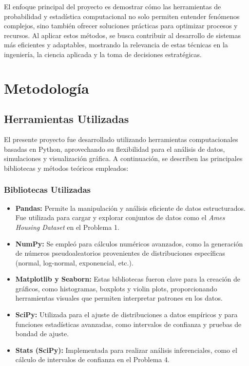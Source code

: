 \documentclass[12pt]{article}
\begin{document}
El enfoque principal del proyecto es demostrar cómo las herramientas de probabilidad y estadística computacional no solo permiten entender fenómenos complejos, sino también ofrecer soluciones prácticas para optimizar procesos y recursos. Al aplicar estos métodos, se busca contribuir al desarrollo de sistemas más eficientes y adaptables, mostrando la relevancia de estas técnicas en la ingeniería, la ciencia aplicada y la toma de decisiones estratégicas.



\section{Metodología}
\subsection{Herramientas Utilizadas}

El presente proyecto fue desarrollado utilizando herramientas computacionales basadas en Python, aprovechando su flexibilidad para el análisis de datos, simulaciones y visualización gráfica. A continuación, se describen las principales bibliotecas y métodos teóricos empleados:

\subsubsection*{Bibliotecas Utilizadas}
\begin{itemize}
    \item \textbf{Pandas:} Permite la manipulación y análisis eficiente de datos estructurados. Fue utilizada para cargar y explorar conjuntos de datos como el \textit{Ames Housing Dataset} en el Problema 1.
    \item \textbf{NumPy:} Se empleó para cálculos numéricos avanzados, como la generación de números pseudoaleatorios provenientes de distribuciones específicas (normal, log-normal, exponencial, etc.).
    \item \textbf{Matplotlib y Seaborn:} Estas bibliotecas fueron clave para la creación de gráficos, como histogramas, boxplots y violin plots, proporcionando herramientas visuales que permiten interpretar patrones en los datos.
    \item \textbf{SciPy:} Utilizada para el ajuste de distribuciones a datos empíricos y para funciones estadísticas avanzadas, como intervalos de confianza y pruebas de bondad de ajuste.
    \item \textbf{Stats (SciPy):} Implementada para realizar análisis inferenciales, como el cálculo de intervalos de confianza en el Problema 4.
\end{itemize}
\end{document}

